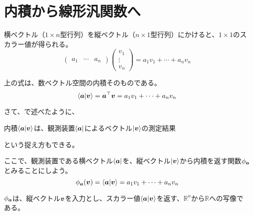 \documentclass[../../../topic_linear-algebra]{subfiles}
\begin{document}
\sectionline
\section{内積から線形汎関数へ}\label{sec:inner-product-to-functional}

横ベクトル（$1 \times n$型行列）を縦ベクトル（$n \times 1$型行列）にかけると、$1 \times 1$のスカラー値が得られる。
\begin{equation*}
  \begin{pmatrix}
    a_1 & \cdots & a_n
  \end{pmatrix} \begin{pmatrix}
    v_1    \\
    \vdots \\
    v_n
  \end{pmatrix}
  = a_1 v_1 + \cdots + a_n v_n
\end{equation*}

上の式は、数ベクトル空間の内積そのものである。
\begin{equation*}
  \braket{\vb*{a}|\vb*{v}} = \vb*{a}^\top\vb*{v} = a_1 v_1 + \cdots + a_n v_n
\end{equation*}

\br

さて、で述べたように、
\begin{emphabox}
  \begin{spacebox}
    \begin{center}
      内積$\braket{\vb*{a}|\vb*{v}}$は、観測装置$\bra{\vb*{a}}$によるベクトル$\ket{\vb*{v}}$の測定結果
    \end{center}
  \end{spacebox}
\end{emphabox}
という捉え方もできる。

\br

ここで、観測装置である横ベクトル$\bra{\vb*{a}}$を、縦ベクトル$\ket{\vb*{v}}$から内積を返す関数$\phi_{\vb*{a}}$とみることにしよう。
\begin{equation*}
  \phi_{\vb*{a}}(\vb*{v}) = \braket{\vb*{a}|\vb*{v}} = a_1 v_1 + \cdots + a_n v_n
\end{equation*}

$\phi_{\vb*{a}}$は、縦ベクトル$\vb*{v}$を入力とし、スカラー値$\braket{\vb*{a}|\vb*{v}}$を返す、$\mathbb{R}^n$から$\mathbb{R}$への写像である。
\end{document}
